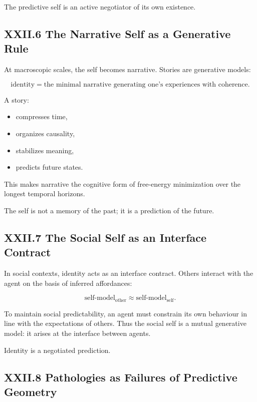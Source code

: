 \documentclass[11pt,letterpaper]{article}
\begin{document}
The predictive self is an active negotiator of its own existence.

\subsection{XXII.6 The Narrative Self as a Generative Rule}

At macroscopic scales, the self becomes narrative.  
Stories are generative models:

\[
\text{identity} = \text{the minimal narrative generating one's experiences with coherence}.
\]

A story:

\begin{itemize}
    \item compresses time,
    \item organizes causality,
    \item stabilizes meaning,
    \item predicts future states.
\end{itemize}

This makes narrative the cognitive form of free-energy minimization over the longest temporal horizons.

The self is not a memory of the past; it is a prediction of the future.

\subsection{XXII.7 The Social Self as an Interface Contract}

In social contexts, identity acts as an interface contract.  
Others interact with the agent on the basis of inferred affordances:

\[
\text{self-model}_{\text{other}} \approx \text{self-model}_{\text{self}}.
\]

To maintain social predictability, an agent must constrain its own behaviour in line with the expectations of others. Thus the social self is a mutual generative model: it arises at the interface between agents.

Identity is a negotiated prediction.

\subsection{XXII.8 Pathologies as Failures of Predictive Geometry}
\end{document}

